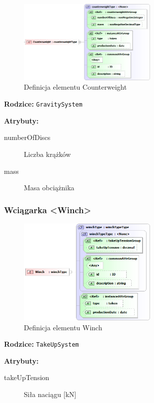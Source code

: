 \documentclass[12pt,a4paper]{article}
\begin{document}
\begin{figure}[H]
  \centering
  \includegraphics[width=0.6\textwidth]{png/liquid/Counterweight}
  \caption{Definicja elementu Counterweight}
  \label{fig:counterweight-xsd}
\end{figure}

\noindent\textbf{Rodzice:} \texttt{GravitySystem}

\noindent\textbf{Atrybuty:}
\begin{description}
\item[numberOfDiscs] Liczba krążków
\item[mass] Masa obciążnika
\end{description}


\subsubsection{Wciągarka <Winch>}

\begin{figure}[H]
  \centering
  \includegraphics[width=0.6\textwidth]{png/liquid/Winch}
  \caption{Definicja elementu Winch}
  \label{fig:winch-xsd}
\end{figure}

\noindent\textbf{Rodzice:} \texttt{TakeUpSystem}

\noindent\textbf{Atrybuty:}
\begin{description}
\item[takeUpTension] Siła naciągu [kN]
\end{description}
\end{document}

